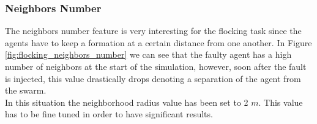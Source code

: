 \documentclass[../../Thesis.tex]{subfiles}
\begin{document}
			\subsubsection{Neighbors Number}
				The neighbors number feature is very interesting for the flocking task since the agents have to keep a formation at a certain distance from one another. In Figure \ref{fig:flocking_neighbors_number} we can see that the faulty agent has a high number of neighbors at the start of the simulation, however, soon after the fault is injected, this value drastically drops denoting a separation of the agent from the swarm. \\
				In this situation the neighborhood radius value has been set to 2 $m$. This value has to be fine tuned in order to have significant results.
				\begin{figure}
					\centering
					\quad
\end{figure}
\end{document}
